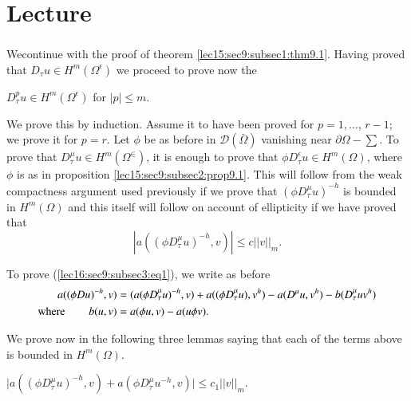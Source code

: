 
\chapter{Lecture}\label{lec16}%
\setcounter{section}{9}

\subsection{}\label{lec16:sec9:subsec3}

We\pageoriginale continue with the proof of theorem \ref{lec15:sec9:subsec1:thm9.1}. Having proved that
$D_{\tau} u \in H^m (\Omega^\epsilon)$ we proceed to prove now the 
\begin{proposition}\label{lec16:sec9:subsec3:prop9.2} %
  $D^p_{\tau} u \in H^m (\Omega^{\epsilon})$ for $|p| \leq m$. 
\end{proposition}

We prove this by induction. Assume it to have been proved for $p = 1,
\ldots$, $r-1$; we prove it for $p=r$. Let $\phi$ be as before in
$\mathscr{D}(\bar{\Omega})$ vanishing near $\partial \Omega-\sum$. To
prove that $D^{\mu}_{\tau} u \in H^m
(\Omega^{\in})$, it is enough to prove that $\phi
D^{\epsilon}_{\tau} u \in H^m (\Omega)$, where $\phi$ is as
in proposition \ref{lec15:sec9:subsec2:prop9.1}. This will follow from the weak compactness
argument used previously if we prove that $(\phi
D^{\mu}_{\tau} u)^{-h} $ is bounded in $H^m (\Omega)$ and this
itself will follow on account of ellipticity if we have proved that  
\begin{equation*}
  |a((\phi D^{\mu}_{\tau} u)^{-h}, v)| \leq c||v||_m \tag{1}.\label{lec16:sec9:subsec3:eq1} 
\end{equation*}

To prove (\ref{lec16:sec9:subsec3:eq1}), we write as before 
\begin{align*}
  a((\phi D u)^{-h}, v)& =(a(\phi D^{\mu}_{\tau} u)^{-h}, v) + a((\phi
  D^{\mu}_{\tau} u), v^h) - a( D^{\mu} u, v^h) -
  b(D^{\mu}_{\tau} u v^{h})\\ 
  \text{where} \hspace{.75cm} b(u, v) & = a(\phi u, v)-a(u \phi v). 
\end{align*}

We prove now in the following three lemmas saying that each of the
terms above is bounded in $H^m(\Omega)$.  

\begin{lemma}\label{lec16:sec9:subsec3:lem9.4} %
  $\big|a((\phi D^{\mu}_{\tau} u)^{-h}, v)+ a(\phi D^{\mu}_{\tau}
  u^{-h}, v)| \leq c_1||v||_m. $ 
\end{lemma}

